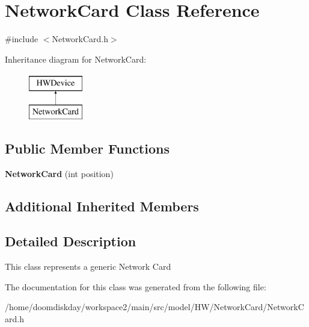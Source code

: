 \hypertarget{classNetworkCard}{}\section{Network\+Card Class Reference}
\label{classNetworkCard}


{\ttfamily \#include $<$Network\+Card.\+h$>$}

Inheritance diagram for Network\+Card\+:\begin{figure}[H]
\begin{center}
\leavevmode
\includegraphics[height=2.000000cm]{classNetworkCard}
\end{center}
\end{figure}
\subsection*{Public Member Functions}
\begin{DoxyCompactItemize}
\item 
{\bfseries Network\+Card} (int position)\hypertarget{classNetworkCard_a6a74d2a0de1390de3ada44a5ee63020f}{}\label{classNetworkCard_a6a74d2a0de1390de3ada44a5ee63020f}

\end{DoxyCompactItemize}
\subsection*{Additional Inherited Members}


\subsection{Detailed Description}
This class represents a generic Network Card 

The documentation for this class was generated from the following file\+:\begin{DoxyCompactItemize}
\item 
/home/doomdiskday/workspace2/main/src/model/\+H\+W/\+Network\+Card/Network\+Card.\+h\end{DoxyCompactItemize}
